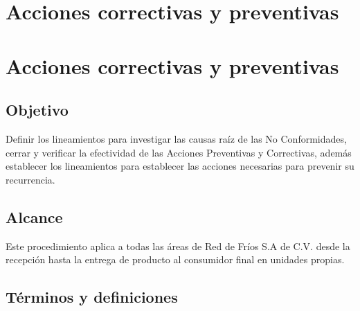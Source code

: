 \renewcommand{\MayorVer}{2}
\renewcommand{\MenorVer}{1}
\renewcommand{\Codigo}{PSA-1-PROG} %
\renewcommand{\FechaPub}{2023--01}

\renewcommand{\Titulo}{Acciones correctivas y preventivas}
\section{\Titulo}
\section{Acciones correctivas y preventivas}

\subsection{Objetivo}

Definir los lineamientos para investigar las causas raíz de las No Conformidades, cerrar y verificar la efectividad de las Acciones Preventivas y Correctivas, además establecer los lineamientos para establecer las acciones necesarias para prevenir su recurrencia.

\subsection{Alcance}

Este procedimiento aplica a todas las áreas de Red de Fríos S.A de C.V. desde la recepción hasta la entrega de producto al consumidor final en unidades propias.

\subsection{Términos y definiciones}

